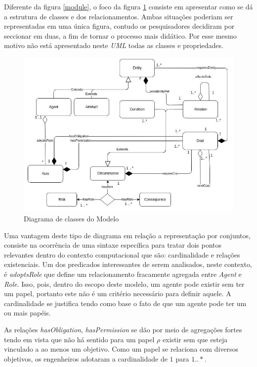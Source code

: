 Diferente da figura \ref{module}, o foco da figura \ref{classdiagrama} consiste em apresentar como se dá a estrutura de classes e dos relacionamentos. Ambas situações poderiam ser representadas em uma única figura, contudo os pesquisadores decidiram por seccionar em duas, a fim de tornar o processo mais didático. Por esse mesmo motivo não está apresentado neste \textit{UML} todas as classes e propriedades.  

\begin{figure}[H]
  \centering
  \includegraphics[width=1\linewidth]{figure/Class.jpeg} 
  \caption{Diagrama de classes do Modelo }
  \label{classdiagrama}
\end{figure}

Uma vantagem deste tipo de diagrama em relação a representação por conjuntos, consiste na ocorrência de uma sintaxe específica para tratar dois pontos relevantes dentro do contexto computacional que são: cardinalidade e relações existenciais. Um dos predicados interessantes de serem analisados, neste contexto, é \textit{adoptsRole} que define um relacionamento fracamente agregada entre \textit{Agent} e \textit{Role}. Isso, pois, dentro do escopo deste modelo, um agente pode existir sem ter um papel, portanto este não é um critério necessário para definir aquele. A cardinalidade se justifica tendo como base o fato de que um agente pode ter um ou mais papéis. 

As relações \textit{hasObligation}, \textit{hasPermission} se dão por meio de agregações fortes tendo em vista que não há sentido para um papel $\rho$ existir sem que esteja vinculado a ao menos um objetivo. Como um papel se relaciona com diversos objetivos, os engenheiros adotaram a cardinalidade de $1$ para $1 .. *$.

